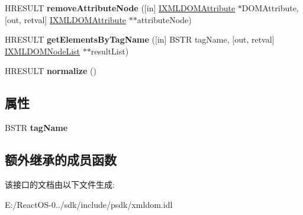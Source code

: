 \begin{DoxyCompactItemize}
H\+R\+E\+S\+U\+LT {\bfseries remove\+Attribute\+Node} (\mbox{[}in\mbox{]} \hyperlink{interface_i_x_m_l_d_o_m_attribute}{I\+X\+M\+L\+D\+O\+M\+Attribute} $\ast$D\+O\+M\+Attribute, \mbox{[}out, retval\mbox{]} \hyperlink{interface_i_x_m_l_d_o_m_attribute}{I\+X\+M\+L\+D\+O\+M\+Attribute} $\ast$$\ast$attribute\+Node)
\item 
\mbox{\label{interface_i_x_m_l_d_o_m_element_a61f74be2d1966bc0fc5a28bb0f9b41cf}} 
H\+R\+E\+S\+U\+LT {\bfseries get\+Elements\+By\+Tag\+Name} (\mbox{[}in\mbox{]} B\+S\+TR tag\+Name, \mbox{[}out, retval\mbox{]} \hyperlink{interface_i_x_m_l_d_o_m_node_list}{I\+X\+M\+L\+D\+O\+M\+Node\+List} $\ast$$\ast$result\+List)
\item 
\mbox{\label{interface_i_x_m_l_d_o_m_element_a6ca02d6ac6512924d366e1971d006968}} 
H\+R\+E\+S\+U\+LT {\bfseries normalize} ()
\end{DoxyCompactItemize}
\subsection*{属性}
\begin{DoxyCompactItemize}
\item 
\mbox{\label{interface_i_x_m_l_d_o_m_element_ac474aa9c9afd467f7e2898c86a8276f6}} 
B\+S\+TR {\bfseries tag\+Name}
\end{DoxyCompactItemize}
\subsection*{额外继承的成员函数}


该接口的文档由以下文件生成\+:\begin{DoxyCompactItemize}
\item 
E\+:/\+React\+O\+S-\/0../sdk/include/psdk/xmldom.\+idl\end{DoxyCompactItemize}

